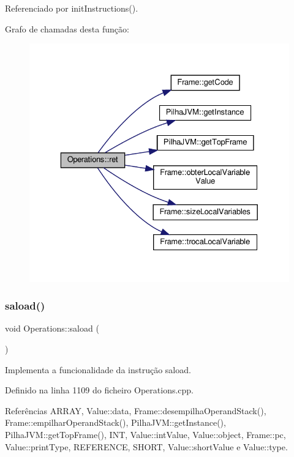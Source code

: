 Referenciado por init\+Instructions().

Grafo de chamadas desta função\+:\nopagebreak
\begin{figure}[H]
\begin{center}
\leavevmode
\includegraphics[width=329pt]{classOperations_a3e7225adafc030be5d6e1c2b0a963a9b_cgraph}
\end{center}
\end{figure}
\mbox{\label{classOperations_ac97743869c458c3ffcda48383308e9b4}} 
\subsubsection{\texorpdfstring{saload()}{saload()}}
{\footnotesize\ttfamily void Operations\+::saload (\begin{DoxyParamCaption}{ }\end{DoxyParamCaption})\hspace{0.3cm}{\ttfamily [private]}}



Implementa a funcionalidade da instrução saload. 



Definido na linha 1109 do ficheiro Operations.\+cpp.



Referências A\+R\+R\+AY, Value\+::data, Frame\+::desempilha\+Operand\+Stack(), Frame\+::empilhar\+Operand\+Stack(), Pilha\+J\+V\+M\+::get\+Instance(), Pilha\+J\+V\+M\+::get\+Top\+Frame(), I\+NT, Value\+::int\+Value, Value\+::object, Frame\+::pc, Value\+::print\+Type, R\+E\+F\+E\+R\+E\+N\+CE, S\+H\+O\+RT, Value\+::short\+Value e Value\+::type.



